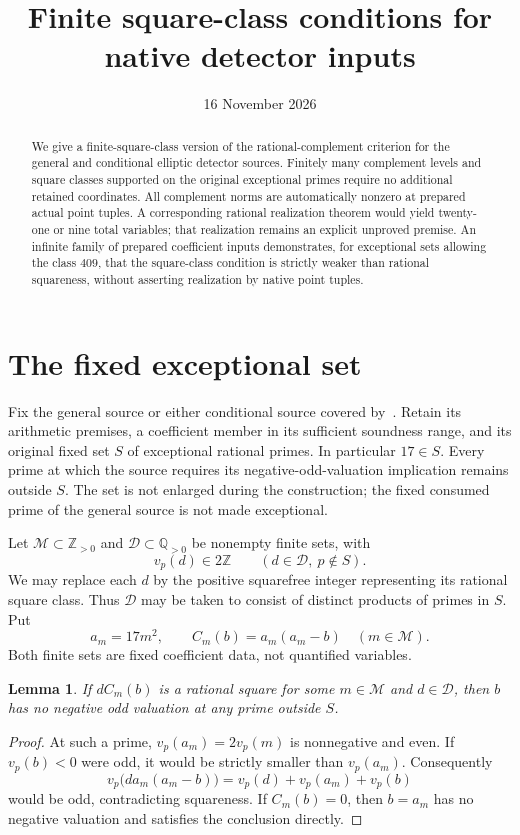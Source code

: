 \documentclass[11pt,a4paper]{article}
\title{Finite square-class conditions for native detector inputs}
\author{}\date{16 November 2026}
\newtheorem{lemma}[theorem]{Lemma}
\newcommand{\Q}{\mathbb Q}\newcommand{\Z}{\mathbb Z}
\begin{document}
\maketitle
\begin{abstract}
We give a finite-square-class version of the rational-complement
criterion for the general and conditional elliptic detector sources.
Finitely many complement levels and square classes supported on the
original exceptional primes require no additional retained coordinates.
All complement norms are automatically nonzero at prepared actual
point tuples. A corresponding rational realization theorem would yield
twenty-one or nine total variables; that realization remains an explicit
unproved premise. An infinite family of prepared coefficient inputs
demonstrates, for exceptional sets allowing the class $409$, that the
square-class condition is strictly weaker than rational squareness,
without asserting realization by native point tuples.
\end{abstract}

\section{The fixed exceptional set}
Fix the general source or either conditional source covered
by~\cite{Complements}. Retain its arithmetic premises, a coefficient
member in its sufficient soundness range, and its original fixed set
$S$ of exceptional rational primes. In particular $17\in S$.
Every prime at which the source requires its negative-odd-valuation
implication remains outside $S$. The set is not enlarged during the
construction; the fixed consumed prime of the general source is not
made exceptional.

Let $\mathcal M\subset\Z_{>0}$ and $\mathcal D\subset\Q_{>0}$ be
nonempty finite sets, with
\begin{equation}\label{eq:classes}
 v_p(d)\in2\Z\qquad(d\in\mathcal D,\ p\notin S).
\end{equation}
We may replace each $d$ by the positive squarefree integer representing
its rational square class. Thus $\mathcal D$ may be taken to consist of
distinct products of primes in $S$. Put
\[
 a_m=17m^2,\qquad C_m(b)=a_m(a_m-b)\quad(m\in\mathcal M).
\]
Both finite sets are fixed coefficient data, not quantified variables.

\begin{lemma}\label{lem:local}
If $dC_m(b)$ is a rational square for some $m\in\mathcal M$ and
$d\in\mathcal D$, then $b$ has no negative odd valuation at any
prime outside $S$.
\end{lemma}
\begin{proof}
At such a prime, $v_p(a_m)=2v_p(m)$ is nonnegative and even. If
$v_p(b)<0$ were odd, it would be strictly smaller than $v_p(a_m)$.
Consequently
\[
 v_p\bigl(d a_m(a_m-b)\bigr)
       =v_p(d)+v_p(a_m)+v_p(b)
\]
would be odd, contradicting squareness. If $C_m(b)=0$, then $b=a_m$
has no negative valuation and satisfies the conclusion directly.
\end{proof}
\end{document}
